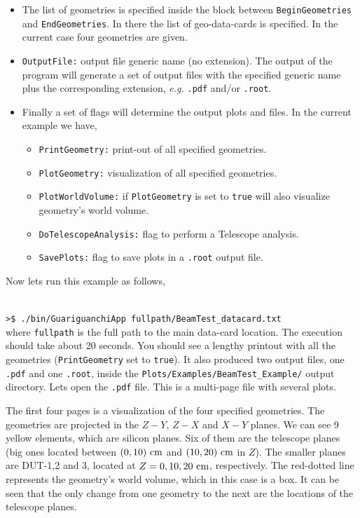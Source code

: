 \begin{itemize}
  \item  The list of geometries is specified inside the block between {\tt BeginGeometries} and {\tt EndGeometries}. In there the list of geo-data-cards is specified.
  In the current case four geometries are given.
  
  \item  {\tt OutputFile:} output file generic name (no extension). The output of the program will generate a set of output files with the specified generic name 
  plus the corresponding extension, {\it e.g.} {\tt .pdf} and/or {\tt .root}.
  
  \item  Finally a set of flags will determine the output plots and files. In the current example we have,
  
  \begin{itemize}
   \item  {\tt PrintGeometry:} print-out of all specified geometries.
   \item  {\tt PlotGeometry:} visualization of all specified geometries.
   \item  {\tt PlotWorldVolume:} if {\tt PlotGeometry} is set to {\tt true} will also visualize geometry's world volume.
   \item  {\tt DoTelescopeAnalysis:} flag to perform a Telescope analysis.
   \item  {\tt SavePlots:} flag to save plots in a {\tt .root} output file.
  \end{itemize}
  
\end{itemize}

\noindent
Now lets run this example as follows,

~\\
\noindent
{\tt >\$ ./bin/GuariguanchiApp  fullpath/BeamTest\_datacard.txt}
~\\

\noindent
where {\tt fullpath} is the full path to the main data-card location.
The execution should take about 20 seconds. You should see a lengthy printout with all the geometries ({\tt PrintGeometry} set to {\tt true}). 
It also produced two output files, one {\tt .pdf} and one {\tt .root}, inside the {\tt Plots/Examples/BeamTest\_Example/} output directory. 
Lets open the {\tt .pdf} file. This is a multi-page file with several plots.

The first four pages is a visualization of the four specified geometries. The geometries are projected in the $Z-Y$, $Z-X$ 
and $X-Y$ planes. We can see 9 yellow elements, which are silicon planes. Six of them are the telescope planes (big ones located between 
$(0,10)~{\rm cm}$ and $(10,20)~{\rm cm}$ in $Z$). The smaller planes are DUT-1,2 and 3, located at $Z = 0,10,20~{\rm cm}$, respectively. 
The red-dotted line represents the geometry's world volume, which in this case is a box. It can be seen that the only change from one 
geometry to the next are the locations of the telescope planes.

